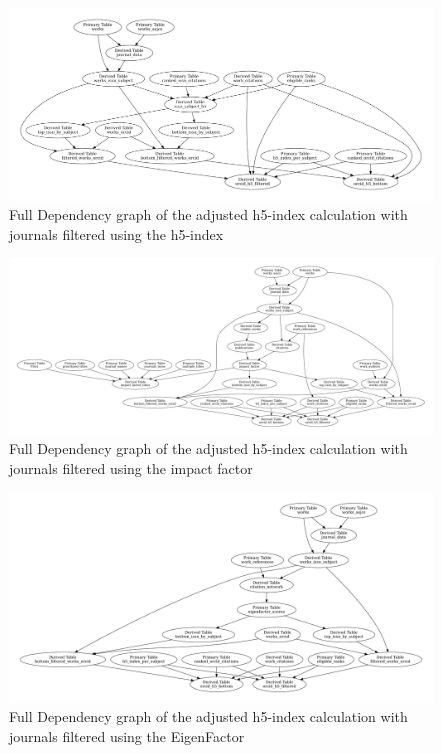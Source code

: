 \begin{figure}[H]
    \centering
    \includegraphics[width=\textwidth]{../figs/full-graph_h5.pdf}
    \caption{Full Dependency graph of the adjusted h5-index calculation with journals filtered using the h5-index}
    \label{fig:dependency_graph_h5}
\end{figure}

\begin{figure}[H]
    \centering
    \includegraphics[width=\textwidth]{../figs/full-graph_jif.pdf}
    \caption{Full Dependency graph of the adjusted h5-index calculation with journals filtered using the impact factor}
    \label{fig:dependency_graph_jif}
\end{figure}

\begin{figure}[H]
    \centering
    \includegraphics[width=\textwidth]{../figs/full-graph_ef.pdf}
    \caption{Full Dependency graph of the adjusted h5-index calculation with journals filtered using the EigenFactor}
    \label{fig:dependency_graph_ef}
\end{figure}

